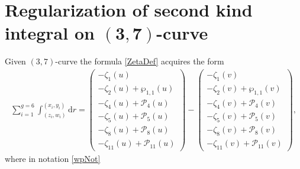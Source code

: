 \documentclass[pdftex]{sigma}
\numberwithin{equation}{section}
\newcommand{\rmd}{\mathrm{d}}
\begin{document}
\section[Regularization of second kind integral on $(3,7)$-curve]{Regularization of second kind integral on $\boldsymbol{(3,7)}$-curve}\label{A:Reg37}
Given $(3,7)$-curve the formula \eqref{ZetaDef} acquires the form
\begin{gather*}%
 \sum_{i=1}^{g=6} \int_{(z_i,w_i)}^{(x_i,y_i)} \rmd r = \begin{pmatrix}
 -\zeta_1(u) \\
 -\zeta_2(u) + \wp_{1,1}(u)\\
 -\zeta_4(u) + \mathcal{P}_4(u) \\
 -\zeta_5(u) + \mathcal{P}_5(u) \\
 -\zeta_8(u) + \mathcal{P}_8(u)\\
 -\zeta_{11}(u) + \mathcal{P}_{11}(u) \end{pmatrix}
 - \begin{pmatrix}
 -\zeta_1(v) \\
 -\zeta_2(v) + \wp_{1,1}(v)\\
 -\zeta_4(v) + \mathcal{P}_4(v) \\
 -\zeta_5(v) + \mathcal{P}_5(v) \\
 -\zeta_8(v) + \mathcal{P}_8(v)\\
 -\zeta_{11}(v) + \mathcal{P}_{11}(v) \end{pmatrix},
\end{gather*}
where in notation \eqref{wpNot}
\end{document}
